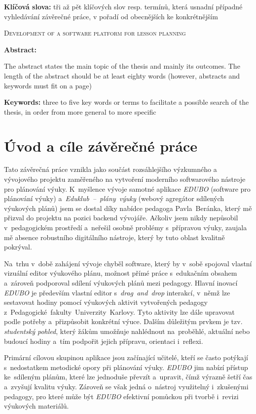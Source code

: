 \documentclass[male,czech,api_bc]{kitheses}
\newcommand{\nazeven}{Development of a software platform for lesson planning}       %
\begin{document}
\textbf{Klíčová slova:} tři až pět klíčových slov resp. termínů, která usnadní případné vyhledávání závěrečné práce, v pořadí od obecnějších ke konkrétnějším

\bigskip


\textsc{\nazeven}

\textbf{Abstract:}

The abstract states the main topic of the thesis and mainly its outcomes. The length of the abstract should be at least eighty words (however, abstracts and keywords must fit on a page)

\textbf{Keywords:} three to five key words or terms to facilitate a possible search of the thesis, in order from more general to more specific

\tableofcontents

\chapter{Úvod a cíle závěrečné práce}

Tato závěrečná práce vznikla jako součást rozsáhlejšího výzkumného a vývojového projektu zaměřeného na vytvoření moderního softwarového nástroje pro plánování výuky. K~myšlence vývoje samotné aplikace \textit{EDUBO} (software pro plánování výuky) a~\textit{Eduklub~–~plány~výuky} (webový agregátor sdílených výukových plánů) jsem se dostal díky nabídce pedagoga Pavla~Beránka, který mě přizval do projektu na pozici backend vývojáře. Ačkoliv jsem nikdy nepůsobil v~pedagogickém prostředí a~neřešil osobně problémy s~přípravou výuky, zaujala mě absence robustního digitálního nástroje, který by tuto oblast kvalitně pokrýval.

Na~trhu v~době zahájení vývoje chyběl software, který by v~sobě spojoval vlastní vizuální editor výukového plánu, možnost přímé práce s~edukačním obsahem a~zároveň podporoval sdílení výukových plánů mezi pedagogy. Hlavní inovací \textit{EDUBO} je především vlastní editor s~\textit{drag~and~drop} interakcí, v~němž lze sestavovat hodiny pomocí výukových aktivit vytvořených pedagogy z~Pedagogické~fakulty~Univerzity~Karlovy. Tyto aktivity lze dále upravovat podle potřeby a~přizpůsobit konkrétní výuce. Dalším důležitým prvkem je tzv. \textit{studentský pohled}, který žákům umožňuje nahlédnout na~proběhlé, aktuální nebo budoucí hodiny a~tím podpořit jejich přípravu, orientaci i~reflexi.

Primární cílovou skupinou aplikace jsou začínající učitelé, kteří se často potýkají s~nedostatkem metodické opory při plánování výuky. \textit{EDUBO} jim nabízí přístup ke~sdíleným plánům, které lze jednoduše převzít a~upravit, čímž výrazně šetří čas a~zvyšují kvalitu výuky. Zároveň se však jedná o~nástroj využitelný i~zkušenými pedagogy, pro které může být \textit{EDUBO} efektivní pomůckou při tvorbě i~revizi výukových materiálů.
\end{document}
